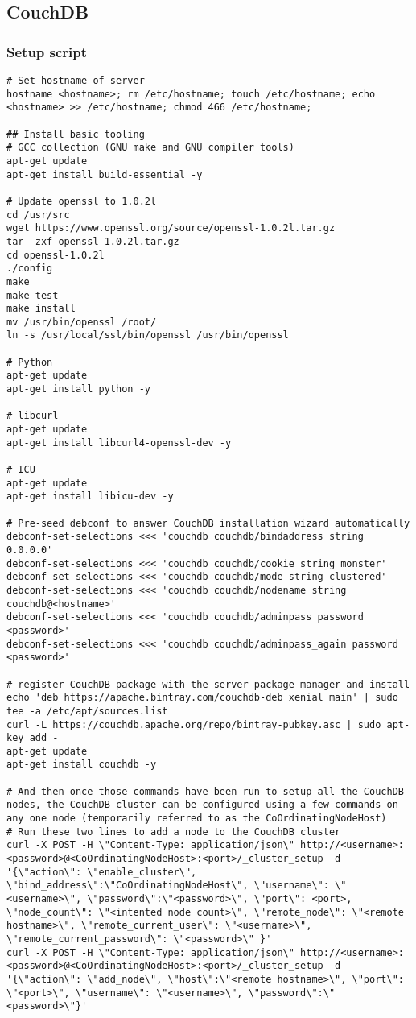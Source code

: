\subsection{CouchDB}

\subsubsection{Setup script}
\label{appendix:couch-setup}
\begin{verbatim}
# Set hostname of server
hostname <hostname>; rm /etc/hostname; touch /etc/hostname; echo <hostname> >> /etc/hostname; chmod 466 /etc/hostname;

## Install basic tooling 
# GCC collection (GNU make and GNU compiler tools)
apt-get update
apt-get install build-essential -y

# Update openssl to 1.0.2l
cd /usr/src
wget https://www.openssl.org/source/openssl-1.0.2l.tar.gz
tar -zxf openssl-1.0.2l.tar.gz
cd openssl-1.0.2l
./config
make
make test
make install
mv /usr/bin/openssl /root/
ln -s /usr/local/ssl/bin/openssl /usr/bin/openssl

# Python
apt-get update
apt-get install python -y

# libcurl
apt-get update
apt-get install libcurl4-openssl-dev -y

# ICU
apt-get update
apt-get install libicu-dev -y

# Pre-seed debconf to answer CouchDB installation wizard automatically
debconf-set-selections <<< 'couchdb couchdb/bindaddress string 0.0.0.0'
debconf-set-selections <<< 'couchdb couchdb/cookie string monster'
debconf-set-selections <<< 'couchdb couchdb/mode string clustered'
debconf-set-selections <<< 'couchdb couchdb/nodename string couchdb@<hostname>'
debconf-set-selections <<< 'couchdb couchdb/adminpass password <password>'
debconf-set-selections <<< 'couchdb couchdb/adminpass_again password <password>'

# register CouchDB package with the server package manager and install
echo 'deb https://apache.bintray.com/couchdb-deb xenial main' | sudo tee -a /etc/apt/sources.list
curl -L https://couchdb.apache.org/repo/bintray-pubkey.asc | sudo apt-key add -
apt-get update
apt-get install couchdb -y

# And then once those commands have been run to setup all the CouchDB nodes, the CouchDB cluster can be configured using a few commands on any one node (temporarily referred to as the CoOrdinatingNodeHost)
# Run these two lines to add a node to the CouchDB cluster
curl -X POST -H \"Content-Type: application/json\" http://<username>:<password>@<CoOrdinatingNodeHost>:<port>/_cluster_setup -d '{\"action\": \"enable_cluster\", \"bind_address\":\"CoOrdinatingNodeHost\", \"username\": \"<username>\", \"password\":\"<password>\", \"port\": <port>, \"node_count\": \"<intented node count>\", \"remote_node\": \"<remote hostname>\", \"remote_current_user\": \"<username>\", \"remote_current_password\": \"<password>\" }'
curl -X POST -H \"Content-Type: application/json\" http://<username>:<password>@<CoOrdinatingNodeHost>:<port>/_cluster_setup -d '{\"action\": \"add_node\", \"host\":\"<remote hostname>\", \"port\": \"<port>\", \"username\": \"<username>\", \"password\":\"<password>\"}'


\end{verbatim}
